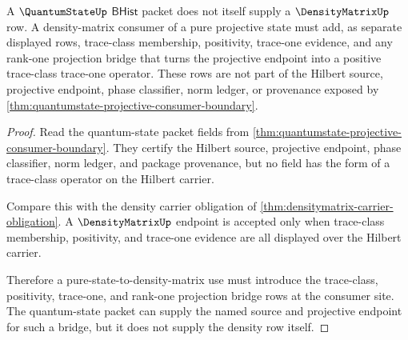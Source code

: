 \begin{theorem}
\label{thm:quantumstate-densitymatrix-boundary}
A $\QuantumStateUp$ $\mathsf{BHist}$ packet does not itself supply a
$\DensityMatrixUp$ row. A density-matrix consumer of a pure projective state
must add, as separate displayed rows, trace-class membership, positivity,
trace-one evidence, and any rank-one projection bridge that turns the
projective endpoint into a positive trace-class trace-one operator. These rows
are not part of the Hilbert source, projective endpoint, phase classifier, norm
ledger, or provenance exposed by
\autoref{thm:quantumstate-projective-consumer-boundary}.
\end{theorem}
\begin{proof}
Read the quantum-state packet fields from
\autoref{thm:quantumstate-projective-consumer-boundary}. They certify the
Hilbert source, projective endpoint, phase classifier, norm ledger, and package
provenance, but no field has the form of a trace-class operator on the Hilbert
carrier.

Compare this with the density carrier obligation of
\autoref{thm:densitymatrix-carrier-obligation}. A $\DensityMatrixUp$ endpoint is
accepted only when trace-class membership, positivity, and trace-one evidence
are all displayed over the Hilbert carrier.

Therefore a pure-state-to-density-matrix use must introduce the trace-class,
positivity, trace-one, and rank-one projection bridge rows at the consumer site.
The quantum-state packet can supply the named source and projective endpoint
for such a bridge, but it does not supply the density row itself.
\end{proof}

